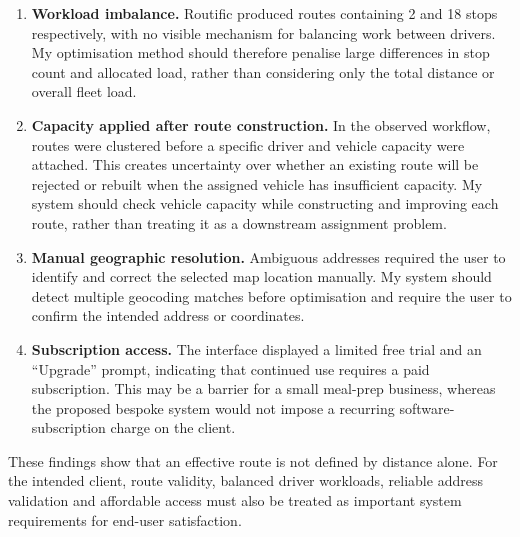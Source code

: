 \documentclass[11pt]{article}
\begin{document}
\begin{enumerate}
    \item \textbf{Workload imbalance.} Routific produced routes containing 2 and 18 stops respectively, with no visible mechanism for balancing work between drivers. My optimisation method should therefore penalise large differences in stop count and allocated load, rather than considering only the total distance or overall fleet load.
    \item \textbf{Capacity applied after route construction.} In the observed workflow, routes were clustered before a specific driver and vehicle capacity were attached. This creates uncertainty over whether an existing route will be rejected or rebuilt when the assigned vehicle has insufficient capacity. My system should check vehicle capacity while constructing and improving each route, rather than treating it as a downstream assignment problem.
    \item \textbf{Manual geographic resolution.} Ambiguous addresses required the user to identify and correct the selected map location manually. My system should detect multiple geocoding matches before optimisation and require the user to confirm the intended address or coordinates.
    \item \textbf{Subscription access.} The interface displayed a limited free trial and an ``Upgrade'' prompt, indicating that continued use requires a paid subscription. This may be a barrier for a small meal-prep business, whereas the proposed bespoke system would not impose a recurring software-subscription charge on the client.
\end{enumerate}

These findings show that an effective route is not defined by distance alone. For the intended client, route validity, balanced driver workloads, reliable address validation and affordable access must also be treated as important system requirements for end-user satisfaction.
\end{document}
